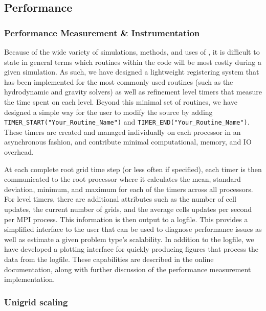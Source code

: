 
\subsection{Performance}
\label{sec.performance}

\subsubsection{Performance Measurement \& Instrumentation}

Because of the wide variety of simulations, methods, and uses of \enzo,
it is difficult to state in general terms which routines within the
code will be most costly during a given simulation.  As such, we have
designed a lightweight registering system that has been implemented
for the most commonly used routines (such as the hydrodynamic and
gravity solvers) as well as refinement level timers that measure the
time spent on each level.  Beyond this minimal set of routines, we
have designed a simple way for the user to modify the source by adding
\texttt{TIMER\_START("Your\_Routine\_Name")} and
\texttt{TIMER\_END("Your\_Routine\_Name")}.  These timers are created
and managed individually on each processor in an asynchronous fashion,
and contribute minimal computational, memory, and IO overhead.

At each complete root grid time step (or less often if specified),
each timer is then communicated to the root processor where it
calculates the mean, standard deviation, minimum, and maximum for each
of the timers across all processors.  For level timers, there are additional
attributes such as the number of cell updates, the current number of
grids, and the average cells updates per second per MPI process.  This
information is then 
output to a logfile.  This provides a simplified interface to the user
that can be used to diagnose performance issues as well as estimate a
given problem type's scalability.  In addition to the logfile, we have
developed a plotting interface for quickly producing figures that
process the data from the logfile.  These capabilities are described
in the online documentation, along with further discussion of the
performance measurement implementation.

\subsubsection{Unigrid scaling}
\label{sec:weak_scaling}

